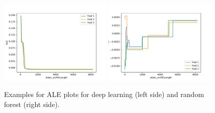 \documentclass[sigconf,nonacm]{acmart}
\begin{document}
\begin{figure}[p]
\includegraphics[width=0.48\textwidth]{plots/ale/apply(stdev(ipTotalLength),forward)_nn.pdf}
\includegraphics[width=0.48\textwidth]{plots/ale/apply(stdev(ipTotalLength),forward)_rf.pdf}

\caption{Examples for ALE plots for deep learning (left side) and random forest (right side).}
\label{fig:ale}
\end{figure}
\end{document}
